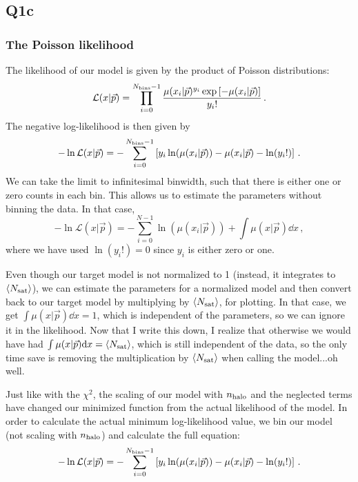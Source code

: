 \subsection{Q1c}

\subsubsection{The Poisson likelihood}
The likelihood of our model is given by the product of Poisson distributions:
\begin{equation}
    \mathcal{L}(x | \vec{p}) = \prod_{i = 0}^{N_{\rm bins} - 1} \frac{\mu(x_{i}|\vec{p})^{y_{i}}\exp\left[-\mu(x_{i}|\vec{p})\right]}{y_{i}!} \, .
\end{equation}
The negative log-likelihood is then given by
\begin{equation}
    -\ln \mathcal{L}(x|\vec{p}) = -\sum_{i = 0}^{N_{\rm bins} - 1}\left[ y_{i} \ln(\mu(x_{i}|\vec{p})) - \mu(x_{i}|\vec{p}) - \ln(y_{i}!) \right] \, .
\end{equation}
We can take the limit to infinitesimal binwidth, such that there is either one or zero counts in each bin. 
This allows us to estimate the parameters without binning the data. In that case,
\begin{equation}
    -\ln \mathcal{L}(x|\vec{p}) = -\sum_{i = 0}^{N - 1} \ln(\mu(x_{i}|\vec{p})) + \int\mu(x|\vec{p}) \dd x \, ,
\end{equation}
where we have used $\ln(y_{i}!) = 0$ since $y_{i}$ is either zero or one.

Even though our target model is not normalized to 1 (instead, it integrates to $\langle N_{\rm sat} \rangle$), we can estimate the parameters for a normalized
model and then convert back to our target model by multiplying by $\langle N_{\rm sat} \rangle$, for plotting. In that case, we get $\int\mu(x|\vec{p}) \dd x = 1$, which
is independent of the parameters, so we can ignore it in the likelihood. Now that I write this down, I realize that otherwise we would have had
$\int\mu(x|\vec{p}) \mathrm{d} x = \langle N_{\rm sat} \rangle$, which is still independent of the data, so the only time
save is removing the multiplication by $\langle N_{\rm sat} \rangle$ when calling the model...oh well.

Just like with the $\chi^2$, the scaling of our model with $n_{\rm halo}$ and the neglected terms have changed our minimized function from the actual likelihood
of the model. In order to calculate the actual minimum log-likelihood value, we bin our model (not scaling with $n_{\rm halo}$) and calculate the full equation:
\begin{equation}
    -\ln \mathcal{L}(x|\vec{p}) = -\sum_{i = 0}^{N_{\rm bins} - 1}\left[ y_{i} \ln(\mu(x_{i}|\vec{p})) - \mu(x_{i}|\vec{p}) - \ln(y_{i}!) \right] \, .
\end{equation}

